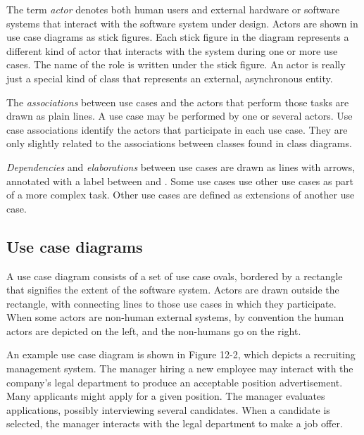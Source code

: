 The term \textit{actor} denotes both human users and
external hardware or software systems that interact with the software
system under design. Actors are shown in use case diagrams as stick
figures. Each stick figure in the diagram represents a different kind
of actor that interacts with the system during one or more use cases.
The name of the role is written under the stick figure. An
actor is really just a special kind of class that represents an
external, asynchronous entity.

The \textit{associations} between use cases
and the actors that perform those tasks are drawn as plain lines. A use
case may be performed by one or several
actors. Use case associations identify the actors that participate in
each use case. They are only slightly related to the associations
between classes found in class diagrams.

\textit{Dependencies} and \textit{elaborations} between use
cases are drawn as lines with arrows, annotated with a label between
\guillemotleft{ } and \guillemotright. Some use cases use other use cases as
part of a more complex task. Other use cases are defined as extensions of
another use case.

\subsection{Use case diagrams}

A use case diagram consists of a set of use case ovals, bordered by a rectangle
that signifies the extent of the software system. Actors are drawn outside the
rectangle, with connecting lines to those use cases in which they
participate. When some actors are non-human external systems, by convention the
human actors are depicted on the left, and the non-humans go on the right.

An example use case diagram is shown in Figure 12-2, which depicts a
recruiting management system. The manager hiring a new employee may
interact with the company's legal department to
produce an acceptable position advertisement. Many applicants might
apply for a given position. The manager evaluates applications,
possibly interviewing several candidates. When a candidate is selected,
the manager interacts with the legal department to make a job offer.

